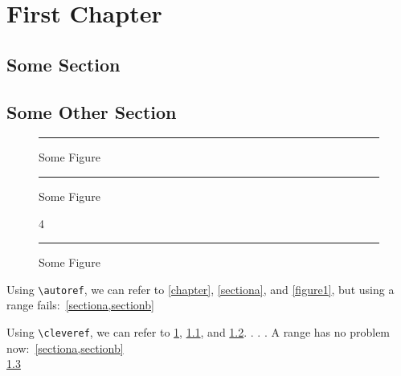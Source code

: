 \documentclass{book}
\begin{document}
\chapter{First Chapter}\label{chapter}
\section{Some Section}\label{sectiona}
\section{Some Other Section}\label{sectionb}

\begin{figure}[!ht]
  \centering
  \rule{30mm}{20mm}
  \caption{Some Figure}\label{figure}
\end{figure}

\begin{figure}[!ht]
  \centering
  \rule{30mm}{20mm}
  \caption{Some Figure}\label{figure1}
\end{figure}

\begin{figure}[!tb]
    \centering
	\caption{4}\label{jhgfgg}
\end{figure}

\begin{figure}[!ht]
  \centering
  \rule{30mm}{20mm}
  \caption{Some Figure}\label{figure2}
\end{figure}

Using \texttt{\textbackslash autoref}, we can refer to \autoref{chapter}, \autoref{sectiona}, and \autoref{figure1}, but using a range fails:~\autoref{sectiona,sectionb}

Using \texttt{\textbackslash cleveref}, we can refer to \cref{chapter}, \cref{sectiona}, and \cref{figure1}. . . . A range has no problem now:~\cref{sectiona,sectionb}\\

\cref{jhgfgg}
\end{document}
